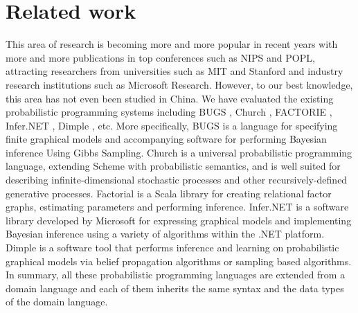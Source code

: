 \chapter{Related work}
\label{chap:related}
This area of research is becoming more and more popular in recent years with more and more publications in top conferences such as NIPS and POPL, attracting researchers from universities such as MIT and Stanford and industry research institutions such as Microsoft Research. However, to our best knowledge, this area has not even been studied in China. We have evaluated the existing probabilistic programming systems including BUGS , Church , FACTORIE , Infer.NET , Dimple , etc. More specifically, BUGS is a language for specifying finite graphical models and accompanying software for performing Bayesian inference Using Gibbs Sampling. Church is a universal probabilistic programming language, extending Scheme with probabilistic semantics, and is well suited for describing infinite-dimensional stochastic processes and other recursively-defined generative processes. Factorial is a Scala library for creating relational factor graphs, estimating parameters and performing inference. Infer.NET is a software library developed by Microsoft for expressing graphical models and implementing Bayesian inference using a variety of algorithms within the .NET platform. Dimple is a software tool that performs inference and learning on probabilistic graphical models via belief propagation algorithms or sampling based algorithms. In summary, all these probabilistic programming languages are extended from a domain language and each of them inherits the same syntax and the data types of the domain language.
